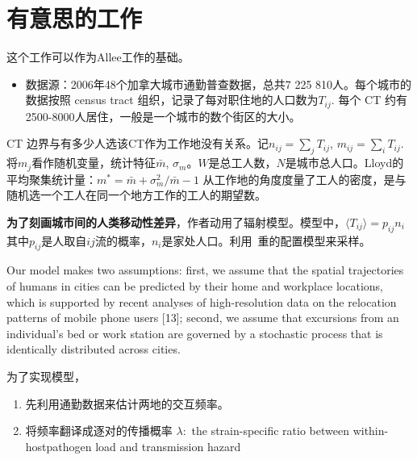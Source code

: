 \section{有意思的工作}

这个工作可以作为Allee工作的基础。

\begin{itemize}
    \item 数据源：2006年48个加拿大城市通勤普查数据，总共7 225 810人。每个城市的数据按照 census tract 组织，记录了每对职住地的人口数为$T_{ij}$. 每个 CT 约有2500-8000人居住，一般是一个城市的数个街区的大小。
\end{itemize}

CT 边界与有多少人选该CT作为工作地没有关系。记$n_{ij} = \sum_j T_{ij}$, $m_{ij} = \sum_i T_{ij}$. 将$m_j$看作随机变量，统计特征$\bar{m}$, $\sigma_m$。$W$是总工人数，$N$是城市总人口。Lloyd的平均聚集统计量：$m^* = \bar{m} + \sigma^2_m/\bar{m} - 1$ 从工作地的角度度量了工人的密度，是与随机选一个工人在同一个地方工作的工人的期望数。

\textbf{为了刻画城市间的人类移动性差异}，作者动用了辐射模型。模型中，$\langle T_{ij} \rangle = p_{ij} n_{i}$其中$p_{ij}$是人取自$ij$流的概率，$n_{i}$是家处人口。利用~\cite{PhysRevE.66.016128}重的配置模型来采样。

Our model makes two assumptions: first, we assume that the spatial trajectories of humans in cities can be predicted by their home and workplace locations, which is supported by recent analyses of high-resolution data on the relocation patterns of mobile phone users [13]; second, we assume that excursions from an individual's bed or work station are governed by a stochastic process that is identically distributed across cities. 

为了实现模型，
\begin{enumerate}
    \item 先利用通勤数据来估计两地的交互频率。
    \item 将频率翻译成逐对的传播概率 $\lambda: $ the strain-specific ratio between within-hostpathogen load and transmission hazard 
\end{enumerate}

\vspace{1cm}

